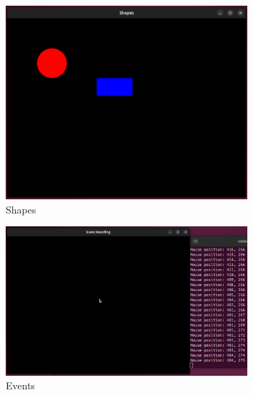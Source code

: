 \begin{figure}[H]
    \centering
    \includegraphics[width=0.8\textwidth]{src/img/sfml_shapes.png}
    \caption{Shapes}
    \label{fig:shapes}
\end{figure}



\begin{figure}[H]
    \centering
    \includegraphics[width=0.8\textwidth]{src/img/sfml_events.png}
    \caption{Events}
    \label{fig:events}
\end{figure}



